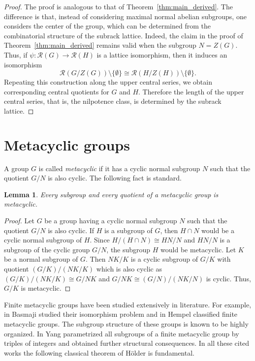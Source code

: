\documentclass[a4paper,12pt]{article}
\newtheorem{lem}[thm]{Lemma}
\theoremstyle{definition}
\theoremstyle{remark}
\begin{document}
\begin{proof}
  The proof is analogous to that of Theorem~\ref{thm:main_derived}. The difference is that, instead of considering maximal normal abelian subgroups, one considers the center of the group, which can be determined from the combinatorial structure of the subrack lattice. Indeed, the claim in the proof of Theorem~\ref{thm:main_derived} remains valid when the subgroup $N=Z(G)$. Thus, if $\psi\colon \mathcal{R}(G)\to \mathcal{R}(H)$ is a lattice isomorphism, then it induces an isomorphism
  $$ \mathcal{R}(G/Z(G))\setminus \{\emptyset\}\cong \mathcal{R}(H/Z(H))\setminus \{\emptyset\}. $$
  Repeating this construction along the upper central series, we obtain corresponding central quotients for $G$ and $H$. Therefore the length of the upper central series, that is, the nilpotence class, is determined by the subrack lattice.
\end{proof}



\section{Metacyclic groups}\label{sec:meta}


A group $G$ is called \emph{metacyclic} if it has a cyclic normal subgroup $N$ such that the quotient $G/N$ is also cyclic. The following fact is standard.

\begin{lem}\label{lem:subgroup_quotient}
  Every subgroup and every quotient of a metacyclic group is metacyclic.
\end{lem}

\begin{proof}
  Let $G$ be a group having a cyclic normal subgroup $N$ such that the quotient $G/N$ is also cyclic. If $H$ is a subgroup of $G$, then $H\cap N$ would be a cyclic normal subgroup of $H$. Since $H/(H\cap N)\cong HN/N$ and $HN/N$ is a subgroup of the cyclic group $G/N$, the subgroup $H$ would be metacyclic. Let $K$ be a normal subgroup of $G$. Then $NK/K$ is a cyclic subgroup of $G/K$ with quotient $(G/K)/(NK/K)$ which is also cyclic as $(G/K)/(NK/K)\cong G/NK$ and $G/NK\cong (G/N)/(NK/N)$ is cyclic. Thus, $G/K$ is metacyclic.
\end{proof}

Finite metacyclic groups have been studied extensively in literature. For example, in \cite{Bas69} Basmaji studied their isomorphism problem and in \cite{Hem00} Hempel classified finite metacyclic groups. The subgroup structure of these groups is known to be highly organized. In \cite{Yan20} Yang parametrized all subgroups of a finite metacyclic group by triples of integers and obtained further structural consequences. In all these cited works the following classical theorem of Hölder is fundamental.
\end{document}
